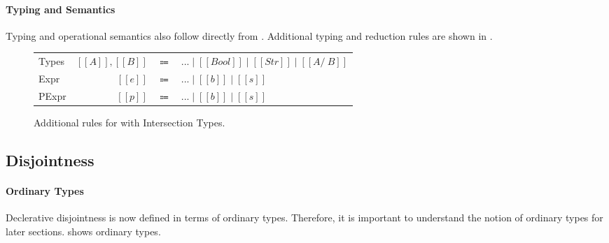 \paragraph{Typing and Semantics}
Typing and operational semantics also follow directly from . Additional typing and
reduction rules are shown in .

\begin{figure}[t]
  \begin{small}
    \centering
    \begin{tabular}{lrcl} \toprule
      Types & $[[A]], [[B]]$ & $\Coloneqq$ & $ ... \mid [[Bool]] \mid [[Str]] \mid [[A /\ B]] $ \\
      Expr & $[[e]]$ & $\Coloneqq$ & $ ... \mid [[b]] \mid [[s]] $\\
      PExpr & $[[p]]$ & $\Coloneqq$ & $ ... \mid [[b]] \mid [[s]] $\\
      \bottomrule
    \end{tabular}
  \end{small}
    \begin{small}
    \centering
  \end{small}
  \begin{small}
    \centering
  \end{small}
    \begin{small}
    \centering
  \end{small}
  \begin{small}
    \centering
  \end{small}
  \caption{Additional rules for \dut with Intersection Types.}
  \label{fig:inter:system}
\end{figure}

\subsection{Disjointness}
\label{sec:inter:disj}

\paragraph{Ordinary Types}
Declerative disjointness is now defined in terms of ordinary types. Therefore, it is important to understand
the notion of ordinary types for later sections.  shows ordinary types.


